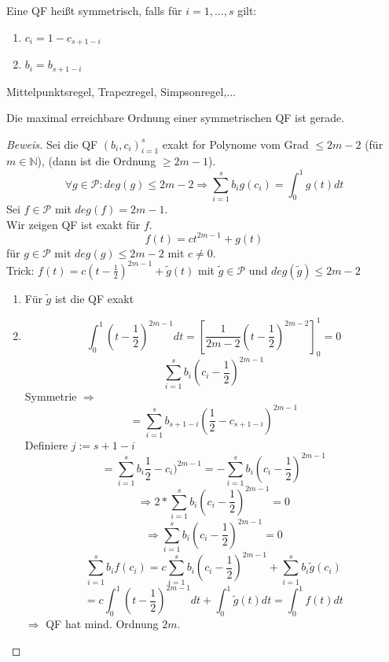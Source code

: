 \begin{definition}
Eine QF heißt symmetrisch, falls für $i = 1,...,s$ gilt:
\begin{enumerate}
  \item $c_i = 1 - c_{s+1-i}$
  \item $b_i = b_{s+1-i}$
\end{enumerate}
\end{definition}

\begin{example}[Symmetrische QF]
Mittelpunktsregel, Trapezregel, Simpsonregel,...
\end{example}

\begin{theorem}
Die maximal erreichbare Ordnung einer symmetrischen QF ist gerade.
\begin{proof}[Beweis]
Sei die QF $(b_i,c_i)_{i=1}^{s}$ exakt for Polynome vom Grad $\leq 2m-2$ (für $m \in \mathbb{N}$), (dann ist die Ordnung $\geq 2m-1$).
$$\forall g \in \mathcal{P}: deg(g) \leq 2m-2 \Rightarrow \sum_{i=1}^{s} b_i g(c_i) = \int_{0}^{1} g(t) dt$$
Sei $f \in \mathcal{P}$ mit $deg(f) = 2m-1$. \\
Wir zeigen QF ist exakt für $f$. 
$$f(t) = ct^{2m-1} + g(t)$$
für $g \in \mathcal{P}$ mit $deg(g) \leq 2m-2$ mit $c \neq 0$. \\
Trick: $f(t) = c(t-\frac{1}{2})^{2m-1} + \tilde{g}(t)$ mit $\tilde{g} \in \mathcal{P}$ und $deg(\tilde{g}) \leq 2m-2$

\begin{enumerate}
  \item Für $\tilde{g}$ ist die QF exakt
  \item $$\int_0^1 (t-\frac{1}{2})^{2m-1} dt = \left[\frac{1}{2m-2}(t-\frac{1}{2})^{2m-2}\right]_0^1 = 0$$
  $$ \sum_{i=1}^{s} b_i (c_i - \frac{1}{2})^{2m-1}$$ 
  Symmetrie $\Rightarrow$
  $$= \sum_{i=1}^{s} b_{s+1-i} (\frac{1}{2} - c_{s+1-i})^{2m-1} $$
  Definiere $j := s+1-i$
  $$ = \sum_{i=1}^{s} b_i \frac{1}{2} - c_i)^{2m-1} = -\sum_{i=1}^{s} b_i (c_i - \frac{1}{2})^{2m-1}$$
  $$\Rightarrow 2*\sum_{i=1}^{s} b_i (c_i - \frac{1}{2})^{2m-1} = 0$$
  $$\Rightarrow \sum_{i=1}^{s} b_i (c_i - \frac{1}{2})^{2m-1} = 0$$
  $$\sum_{i=1}^{s}b_if(c_i) = c \sum_{i=1}^{s}b_i(c_i-\frac{1}{2})^{2m-1} + \sum_{i=1}^{s}b_i\tilde{g}(c_i)$$
  $$ = c\int_0^1(t-\frac{1}{2})^{2m-1} dt + \int_0^1 \tilde{g}(t)dt = \int_0^1 f(t)dt$$
  $\Rightarrow$ QF hat mind. Ordnung $2m$.
\end{enumerate}
\end{proof}
\end{theorem}

